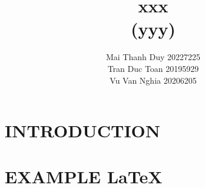 \documentclass[twocolumn]{article}
\begin{document}
\title{xxx\\(yyy)}
\author{
Mai Thanh Duy 20227225 \\
Tran Duc Toan 20195929 \\
Vu Van Nghia 20206205
}
\maketitle


\section{INTRODUCTION}


% 

% 

% 

% 

\renewcommand{\refname}{REFERENCES}


\newpage
\section{EXAMPLE \LaTeX}

\end{document}
